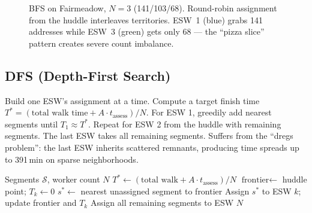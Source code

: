 \documentclass[conference]{IEEEtran}
\begin{document}
\begin{figure}[htbp]
\centering
{}
\caption{BFS on Fairmeadow, $N=3$ (141/103/68). Round-robin assignment from the huddle interleaves territories. ESW~1 (blue) grabs 141 addresses while ESW~3 (green) gets only 68 --- the ``pizza slice'' pattern creates severe count imbalance.}
\end{figure}

\subsection{DFS (Depth-First Search)}

Build one ESW's assignment at a time. Compute a target finish time $T^* = (\text{total walk time} + A \cdot t_{\text{assess}}) / N$. For ESW 1, greedily add nearest segments until $T_1 \approx T^*$. Repeat for ESW 2 from the huddle with remaining segments. The last ESW takes all remaining segments. Suffers from the ``dregs problem'': the last ESW inherits scattered remnants, producing time spreads up to 391\,min on sparse neighborhoods.

\begin{algorithm}[htbp]
\caption{DFS}
\begin{algorithmic}[1]
\REQUIRE Segments $\mathcal{S}$, worker count $N$
\STATE $T^* \leftarrow (\text{total walk} + A \cdot t_{\text{assess}}) / N$
    \STATE $\text{frontier} \leftarrow$ huddle point; $T_k \leftarrow 0$
        \STATE $s^* \leftarrow$ nearest unassigned segment to frontier
        \STATE Assign $s^*$ to ESW $k$; update frontier and $T_k$
    \ENDWHILE
\ENDFOR
\STATE Assign all remaining segments to ESW $N$
\end{algorithmic}
\end{algorithm}
\end{document}
